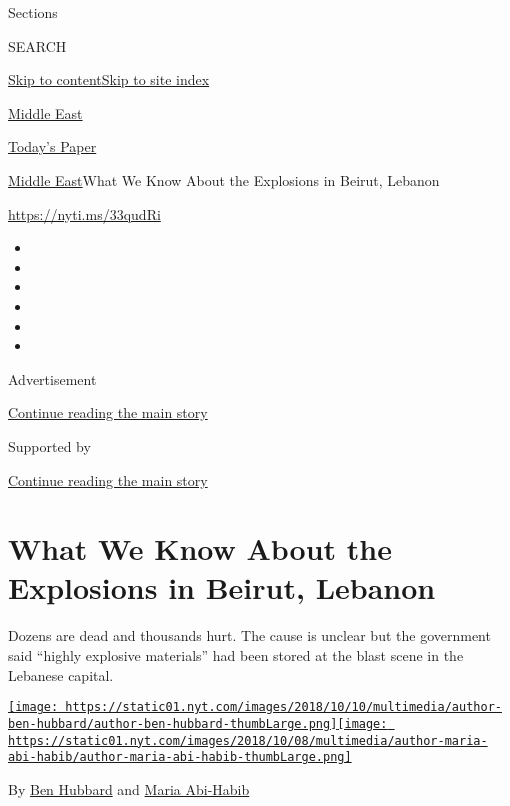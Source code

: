 Sections

SEARCH

\protect\hyperlink{site-content}{Skip to
content}\protect\hyperlink{site-index}{Skip to site index}

\href{https://www.nytimes.com/section/world/middleeast}{Middle East}

\href{https://myaccount.nytimes.com/auth/login?response_type=cookie\&client_id=vi}{}

\href{https://www.nytimes.com/section/todayspaper}{Today's Paper}

\href{/section/world/middleeast}{Middle East}\textbar{}What We Know
About the Explosions in Beirut, Lebanon

\url{https://nyti.ms/33qudRi}

\begin{itemize}
\item
\item
\item
\item
\item
\item
\end{itemize}

Advertisement

\protect\hyperlink{after-top}{Continue reading the main story}

Supported by

\protect\hyperlink{after-sponsor}{Continue reading the main story}

\hypertarget{what-we-know-about-the-explosions-in-beirut-lebanon}{%
\section{What We Know About the Explosions in Beirut,
Lebanon}\label{what-we-know-about-the-explosions-in-beirut-lebanon}}

Dozens are dead and thousands hurt. The cause is unclear but the
government said ``highly explosive materials'' had been stored at the
blast scene in the Lebanese capital.

\href{https://www.nytimes.com/by/ben-hubbard}{\texttt{[image: https://static01.nyt.com/images/2018/10/10/multimedia/author-ben-hubbard/author-ben-hubbard-thumbLarge.png]}}\href{https://www.nytimes.com/by/maria-abi-habib}{\texttt{[image: https://static01.nyt.com/images/2018/10/08/multimedia/author-maria-abi-habib/author-maria-abi-habib-thumbLarge.png]}}

By \href{https://www.nytimes.com/by/ben-hubbard}{Ben Hubbard} and
\href{https://www.nytimes.com/by/maria-abi-habib}{Maria Abi-Habib}


